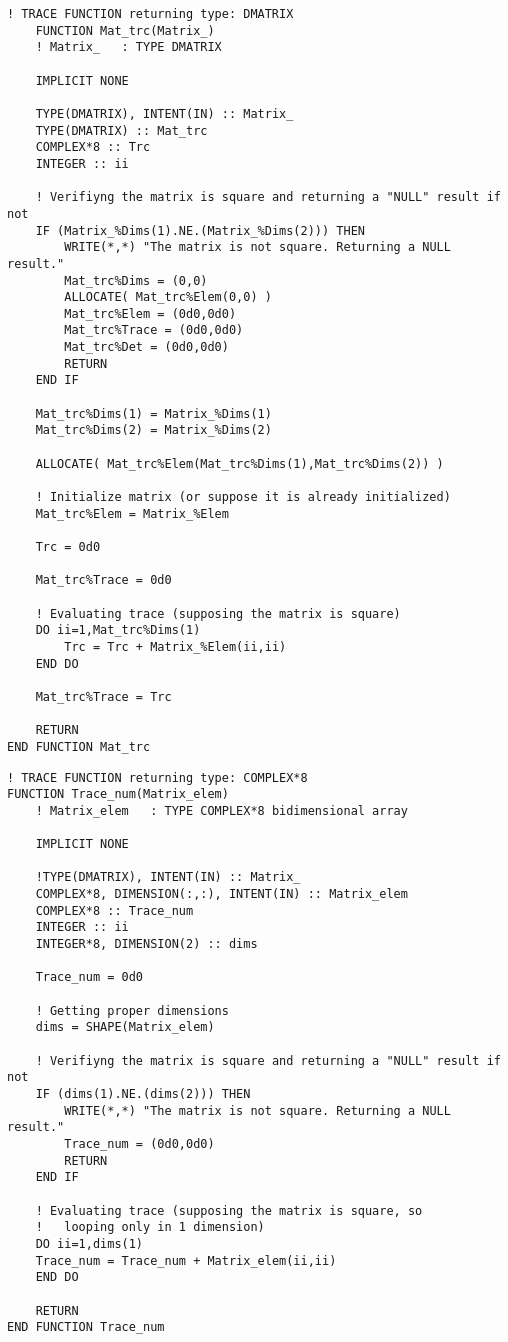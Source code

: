 \documentclass[12pt, a4paper, notitlepage]{report}
\begin{document}
\begin{lstlisting}
! TRACE FUNCTION returning type: DMATRIX
	FUNCTION Mat_trc(Matrix_)
	! Matrix_	: TYPE DMATRIX
	
	IMPLICIT NONE
	
	TYPE(DMATRIX), INTENT(IN) :: Matrix_
	TYPE(DMATRIX) :: Mat_trc
	COMPLEX*8 :: Trc
	INTEGER :: ii
	
	! Verifiyng the matrix is square and returning a "NULL" result if not
	IF (Matrix_%Dims(1).NE.(Matrix_%Dims(2))) THEN
		WRITE(*,*) "The matrix is not square. Returning a NULL result."
		Mat_trc%Dims = (0,0)
		ALLOCATE( Mat_trc%Elem(0,0) )
		Mat_trc%Elem = (0d0,0d0)
		Mat_trc%Trace = (0d0,0d0)
		Mat_trc%Det = (0d0,0d0)
		RETURN
	END IF
	
	Mat_trc%Dims(1) = Matrix_%Dims(1)
	Mat_trc%Dims(2) = Matrix_%Dims(2)
	
	ALLOCATE( Mat_trc%Elem(Mat_trc%Dims(1),Mat_trc%Dims(2)) )
		
	! Initialize matrix (or suppose it is already initialized)
	Mat_trc%Elem = Matrix_%Elem
	
	Trc = 0d0
	
	Mat_trc%Trace = 0d0
	
	! Evaluating trace (supposing the matrix is square)
	DO ii=1,Mat_trc%Dims(1)
		Trc = Trc + Matrix_%Elem(ii,ii)
	END DO
	
	Mat_trc%Trace = Trc
	
	RETURN
END FUNCTION Mat_trc
\end{lstlisting}

\begin{lstlisting}
! TRACE FUNCTION returning type: COMPLEX*8
FUNCTION Trace_num(Matrix_elem)
	! Matrix_elem	: TYPE COMPLEX*8 bidimensional array
	
	IMPLICIT NONE
	
	!TYPE(DMATRIX), INTENT(IN) :: Matrix_
	COMPLEX*8, DIMENSION(:,:), INTENT(IN) :: Matrix_elem
	COMPLEX*8 :: Trace_num
	INTEGER :: ii
	INTEGER*8, DIMENSION(2) :: dims
	
	Trace_num = 0d0
	
	! Getting proper dimensions
	dims = SHAPE(Matrix_elem)
	
	! Verifiyng the matrix is square and returning a "NULL" result if not
	IF (dims(1).NE.(dims(2))) THEN
		WRITE(*,*) "The matrix is not square. Returning a NULL result."
		Trace_num = (0d0,0d0)
		RETURN
	END IF
	
	! Evaluating trace (supposing the matrix is square, so
	!	looping only in 1 dimension)
	DO ii=1,dims(1)
	Trace_num = Trace_num + Matrix_elem(ii,ii)
	END DO
	
	RETURN
END FUNCTION Trace_num
\end{lstlisting}
\end{document}
